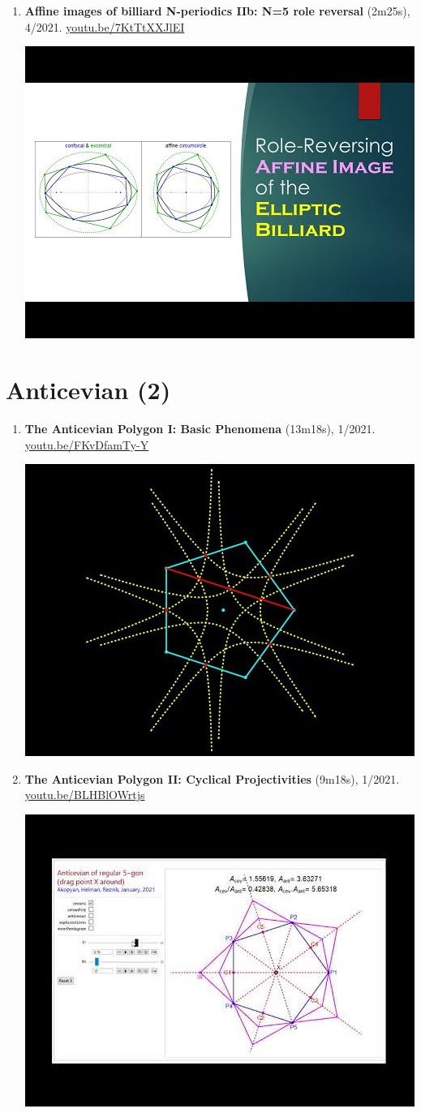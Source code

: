 \documentclass[12pt]{article}
\begin{document}
\begin{enumerate}[resume]
% 
\item \textbf{Affine images of billiard N-periodics IIb: N=5 role reversal} (2m25s), 4/2021. \href{https://youtu.be/7KtTtXXJlEI}{\url{youtu.be/7KtTtXXJlEI}}
\begin{center}\includegraphics[width=.5\textwidth]{pics/7KtTtXXJlEI.jpg}\end{center}
% 
\end{enumerate}

\section{Anticevian (2)}

\begin{enumerate}[resume]
\item \textbf{The Anticevian Polygon I: Basic Phenomena} (13m18s), 1/2021. \href{https://youtu.be/FKvDfamTy-Y}{\url{youtu.be/FKvDfamTy-Y}}
\begin{center}\includegraphics[width=.5\textwidth]{pics/FKvDfamTy-Y.jpg}\end{center}
% 
\item \textbf{The Anticevian Polygon II: Cyclical Projectivities} (9m18s), 1/2021. \href{https://youtu.be/BLHBlOWrtjs}{\url{youtu.be/BLHBlOWrtjs}}
\begin{center}\includegraphics[width=.5\textwidth]{pics/BLHBlOWrtjs.jpg}\end{center}
% 
\end{enumerate}
\end{document}
